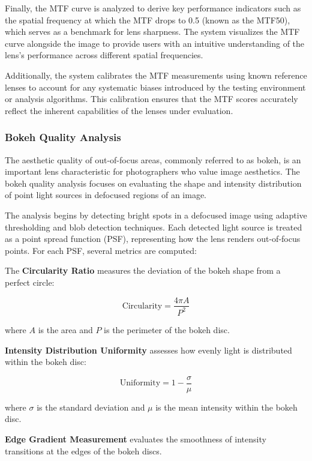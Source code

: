 Finally, the MTF curve is analyzed to derive key performance indicators such as the spatial frequency at which the MTF drops to 0.5 (known as the MTF50), which serves as a benchmark for lens sharpness. The system visualizes the MTF curve alongside the image to provide users with an intuitive understanding of the lens's performance across different spatial frequencies.

Additionally, the system calibrates the MTF measurements using known reference lenses to account for any systematic biases introduced by the testing environment or analysis algorithms. This calibration ensures that the MTF scores accurately reflect the inherent capabilities of the lenses under evaluation.

\subsubsection{Bokeh Quality Analysis}
The aesthetic quality of out-of-focus areas, commonly referred to as bokeh, is an important lens characteristic for photographers who value image aesthetics. The bokeh quality analysis focuses on evaluating the shape and intensity distribution of point light sources in defocused regions of an image.

The analysis begins by detecting bright spots in a defocused image using adaptive thresholding and blob detection techniques. Each detected light source is treated as a point spread function (PSF), representing how the lens renders out-of-focus points. For each PSF, several metrics are computed:

The \textbf{Circularity Ratio} measures the deviation of the bokeh shape from a perfect circle:

\begin{equation}
\text{Circularity} = \frac{4\pi A}{P^2}
\end{equation}

where \( A \) is the area and \( P \) is the perimeter of the bokeh disc.

\textbf{Intensity Distribution Uniformity} assesses how evenly light is distributed within the bokeh disc:

\begin{equation}
\text{Uniformity} = 1 - \frac{\sigma}{\mu}
\end{equation}

where \( \sigma \) is the standard deviation and \( \mu \) is the mean intensity within the bokeh disc.

\textbf{Edge Gradient Measurement} evaluates the smoothness of intensity transitions at the edges of the bokeh discs.

